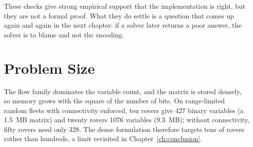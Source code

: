 These checks give strong empirical support that the implementation is right,
but they are not a formal proof. What they do settle is a question that comes
up again and again in the next chapter: if a solver later returns a poor
answer, the solver is to blame and not the encoding.

\section{Problem Size}

The flow family dominates the variable count, and the matrix is stored
densely, so memory grows with the square of the number of bits. On
range-limited random fleets with connectivity enforced, ten rovers give 427
binary variables (a 1.5~MB matrix) and twenty rovers 1076 variables (9.3~MB);
without connectivity, fifty rovers need only 328. The dense formulation
therefore targets tens of rovers rather than hundreds, a limit revisited in
Chapter~\ref{ch:conclusion}.
